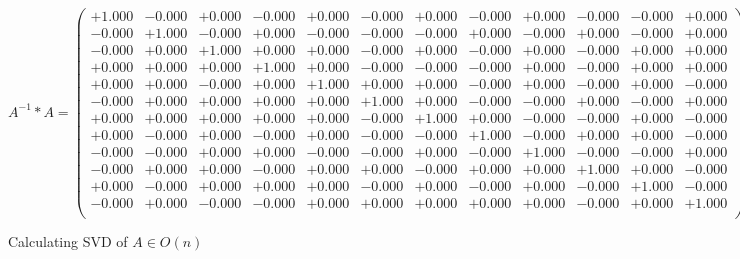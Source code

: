 \documentclass[9pt]{article}
\theoremstyle{plain}
\theoremstyle{definition}
\theoremstyle{remark}
\numberwithin{equation}{section}
\begin{document}
$A^{-1} *A = \left(
\begin{array}{
cccccccccccc}
+1.000 & -0.000 & +0.000 & -0.000 & +0.000 & -0.000 & +0.000 & -0.000 & +0.000 & -0.000 & -0.000 & +0.000 \\
-0.000 & +1.000 & -0.000 & +0.000 & -0.000 & -0.000 & -0.000 & +0.000 & -0.000 & +0.000 & -0.000 & +0.000 \\
-0.000 & +0.000 & +1.000 & +0.000 & +0.000 & -0.000 & +0.000 & -0.000 & +0.000 & -0.000 & +0.000 & +0.000 \\
+0.000 & +0.000 & +0.000 & +1.000 & +0.000 & -0.000 & -0.000 & -0.000 & +0.000 & -0.000 & +0.000 & +0.000 \\
+0.000 & +0.000 & -0.000 & +0.000 & +1.000 & +0.000 & +0.000 & -0.000 & +0.000 & -0.000 & +0.000 & -0.000 \\
-0.000 & +0.000 & +0.000 & +0.000 & +0.000 & +1.000 & +0.000 & -0.000 & -0.000 & +0.000 & -0.000 & +0.000 \\
+0.000 & +0.000 & +0.000 & +0.000 & +0.000 & -0.000 & +1.000 & +0.000 & -0.000 & -0.000 & +0.000 & -0.000 \\
+0.000 & -0.000 & +0.000 & -0.000 & +0.000 & -0.000 & -0.000 & +1.000 & -0.000 & +0.000 & +0.000 & -0.000 \\
-0.000 & -0.000 & +0.000 & +0.000 & -0.000 & -0.000 & +0.000 & -0.000 & +1.000 & -0.000 & -0.000 & +0.000 \\
-0.000 & +0.000 & +0.000 & -0.000 & +0.000 & +0.000 & -0.000 & +0.000 & +0.000 & +1.000 & +0.000 & -0.000 \\
+0.000 & -0.000 & +0.000 & +0.000 & +0.000 & -0.000 & +0.000 & -0.000 & +0.000 & -0.000 & +1.000 & -0.000 \\
-0.000 & +0.000 & -0.000 & -0.000 & +0.000 & +0.000 & +0.000 & +0.000 & +0.000 & -0.000 & +0.000 & +1.000 \\
\end{array}
\right)$ \newline 

Calculating SVD of  $A \in O(n)$
\end{document}
